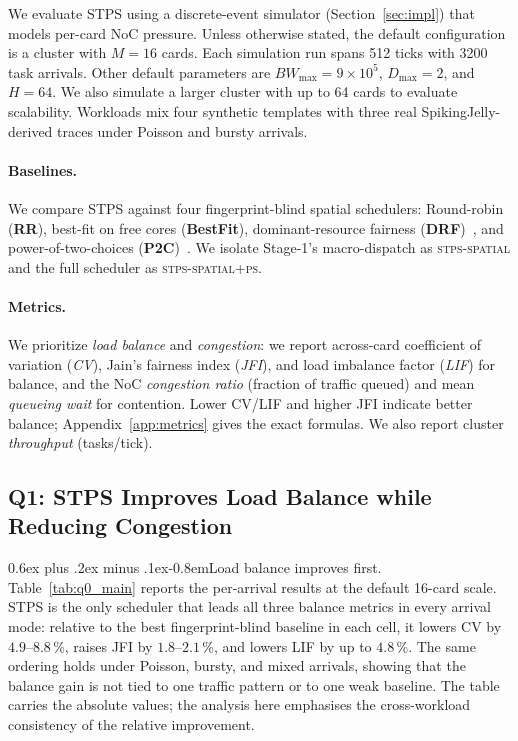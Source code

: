 \documentclass[letterpaper,twocolumn,10pt]{article}
\makeatletter
\newcommand{\tightparagraph}{\@startsection{paragraph}{4}{\z@}%
    {0.6ex plus .2ex minus .1ex}{-0.8em}{\normalfont\normalsize\bfseries}}
\makeatother
\begin{document}
We evaluate STPS using a discrete-event simulator (Section~\ref{sec:impl}) that models per-card NoC pressure. Unless otherwise stated, the default configuration is a cluster with $M\!=\!16$ cards. Each simulation run spans 512 ticks with 3200 task arrivals. Other default parameters are $BW_{\max}\!=\!9\!\times\!10^{5}$, $D_{\max}\!=\!2$, and $H\!=\!64$. We also simulate a larger cluster with up to 64 cards to evaluate scalability. Workloads mix four synthetic templates with three real SpikingJelly-derived traces under Poisson and bursty arrivals.

\paragraph{Baselines.} We compare STPS against four fingerprint-blind spatial schedulers: Round-robin (\textbf{RR}), best-fit on free cores (\textbf{BestFit}), dominant-resource fairness (\textbf{DRF})~\cite{ghodsi2011dominant}, and power-of-two-choices (\textbf{P2C})~\cite{mohan2022looking}. We isolate Stage-1's macro-dispatch as \textsc{stps-spatial} and the full scheduler as \textsc{stps-spatial+ps}.

\paragraph{Metrics.} We prioritize \emph{load balance} and \emph{congestion}: we report across-card coefficient of variation (\emph{CV}), Jain's fairness index (\emph{JFI}), and load imbalance factor (\emph{LIF}) for balance, and the NoC \emph{congestion ratio} (fraction of traffic queued) and mean \emph{queueing wait} for contention. Lower CV/LIF and higher JFI indicate better balance; Appendix~\ref{app:metrics} gives the exact formulas. We also report cluster \emph{throughput} (tasks/tick).

\subsection{Q1: STPS Improves Load Balance while Reducing Congestion}
\label{sec:eval:balance}

\tightparagraph{Load balance improves first.} Table~\ref{tab:q0_main} reports the per-arrival results at the default 16-card scale. STPS is the only scheduler that leads all three balance metrics in every arrival mode: relative to the best fingerprint-blind baseline in each cell, it lowers CV by $4.9$--$8.8$\,\%, raises JFI by $1.8$--$2.1$\,\%, and lowers LIF by up to $4.8$\,\%. The same ordering holds under Poisson, bursty, and mixed arrivals, showing that the balance gain is not tied to one traffic pattern or to one weak baseline. The table carries the absolute values; the analysis here emphasises the cross-workload consistency of the relative improvement.
\end{document}
